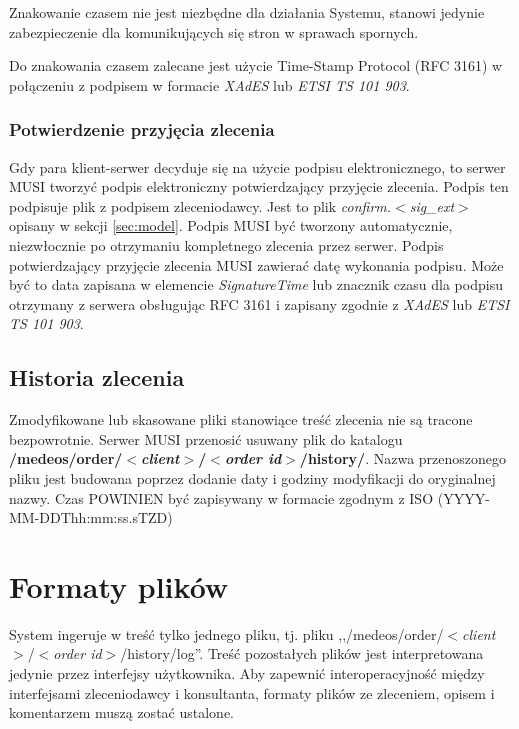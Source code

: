 \documentclass[a4paper]{article}
\begin{document}
Znakowanie czasem nie jest niezbędne dla działania Systemu, stanowi jedynie
zabezpieczenie dla komunikujących się stron w sprawach spornych.

Do znakowania czasem zalecane jest użycie Time-Stamp Protocol (RFC 3161) w połączeniu z
podpisem w formacie \textit{XAdES} lub \textit{ETSI TS 101 903}.

\subsubsection{Potwierdzenie przyjęcia zlecenia}

Gdy para klient-serwer decyduje się na użycie podpisu elektronicznego, to serwer MUSI
tworzyć podpis elektroniczny potwierdzający przyjęcie zlecenia. Podpis ten podpisuje plik z
podpisem zleceniodawcy. Jest to plik \emph{confirm.$<$\textit{sig\_ext}$>$} opisany w
sekcji \ref{sec:model}. Podpis MUSI być tworzony automatycznie, niezwłocznie po otrzymaniu
kompletnego zlecenia przez serwer. Podpis potwierdzający przyjęcie zlecenia MUSI zawierać
datę wykonania podpisu. Może być to data zapisana w elemencie \emph{SignatureTime} lub
znacznik czasu dla podpisu otrzymany z serwera obsługując RFC 3161 i zapisany zgodnie z
\textit{XAdES} lub \textit{ETSI TS 101 903}.

\subsection{Historia zlecenia}
\label{sec:hist}

Zmodyfikowane lub skasowane pliki stanowiące treść zlecenia nie są tracone bezpowrotnie.
Serwer MUSI przenosić usuwany plik do katalogu\\
\textbf{/medeos/order/$<$\textit{client}$>$/$<$\textit{order id}$>$/history/}.
Nazwa przenoszonego pliku jest budowana poprzez dodanie daty i godziny modyfikacji do
oryginalnej nazwy. Czas POWINIEN być zapisywany w formacie zgodnym z ISO (YYYY-MM-DDThh:mm:ss.sTZD)

\section{Formaty plików}
\label{sec:formaty}

System ingeruje w treść tylko jednego pliku, tj. pliku \newline
,,/medeos/order/$<$\textit{client}$>$/$<$\textit{order id}$>$/history/log''. \newline Treść
pozostałych plików jest interpretowana jedynie przez interfejsy użytkownika. Aby zapewnić
interoperacyjność między interfejsami zleceniodawcy i konsultanta, formaty plików ze
zleceniem, opisem i komentarzem muszą zostać ustalone. 
\end{document}
